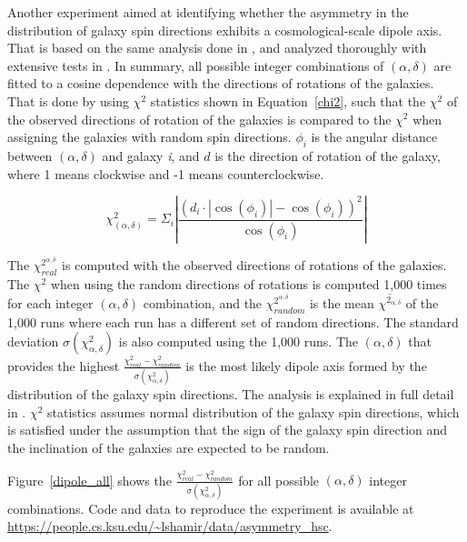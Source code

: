 \documentclass[final,5p,times,twocolumn]{article}
\begin{document}
Another experiment aimed at identifying whether the asymmetry in the distribution of galaxy spin directions exhibits a cosmological-scale dipole axis. That is based on the same analysis done in \citep{shamir2019large,shamir2020patterns,shamir2020pasa,shamir2022asymmetry,shamir2022asymmetry,shamir2021large,shamir2022analysis}, and analyzed thoroughly with extensive tests in \citep{shamir2021particles}. In summary, all possible integer combinations of $(\alpha,\delta)$ are fitted to a cosine dependence with the directions of rotations of the galaxies. That is done by using $\chi^2$ statistics shown in Equation~\ref{chi2}, such that the $\chi^2$ of the observed directions of rotation of the galaxies is compared to the $\chi^2$ when assigning the galaxies with random spin directions. $\phi_i$ is the angular distance between $(\alpha,\delta)$ and galaxy {\it i}, and $d$ is the direction of rotation of the galaxy, where 1 means clockwise and -1 means counterclockwise. 

\begin{equation}
\chi^2_{(\alpha,\delta)}=\Sigma_i | \frac{(d_i \cdot | \cos(\phi_i)| - \cos(\phi_i))^2}{\cos(\phi_i)} |
\label{chi2}
\end{equation}


The $\chi^{2^{\alpha,\delta}}_{real}$ is computed with the observed directions of rotations of the galaxies. The $\chi^2$ when using the random directions of rotations is computed 1,000 times for each integer $(\alpha,\delta)$ combination, and the $\chi^{2^{\alpha,\delta}}_{random}$ is the mean $\overline{\chi^{2_{\alpha,\delta}}}$ of the 1,000 runs where each run has a different set of random directions. The standard deviation $\sigma(\chi^2_{\alpha,\delta})$ is also computed using the 1,000 runs. The $(\alpha,\delta)$ that provides the highest $\frac{\chi^2_{real}-\chi^2_{random}}{\sigma(\chi^2_{\alpha,\delta})}$ is the most likely dipole axis formed by the distribution of the galaxy spin directions. The analysis is explained in full detail in \citep{shamir2019large,shamir2020patterns,shamir2020pasa,shamir2022asymmetry,shamir2022asymmetry,shamir2021large,shamir2021particles,shamir2022analysis}. $\chi^2$ statistics assumes normal distribution of the galaxy spin directions, which is satisfied under the assumption that the sign of the galaxy spin direction and the inclination of the galaxies are expected to be random.

Figure~\ref{dipole_all} shows the $\frac{\chi^2_{real}-\chi^2_{random}}{\sigma(\chi^2_{\alpha,\delta})}$ for all possible $(\alpha,\delta)$ integer combinations. Code and data to reproduce the experiment is available at \url{https://people.cs.ksu.edu/~lshamir/data/asymmetry_hsc}.
\end{document}

